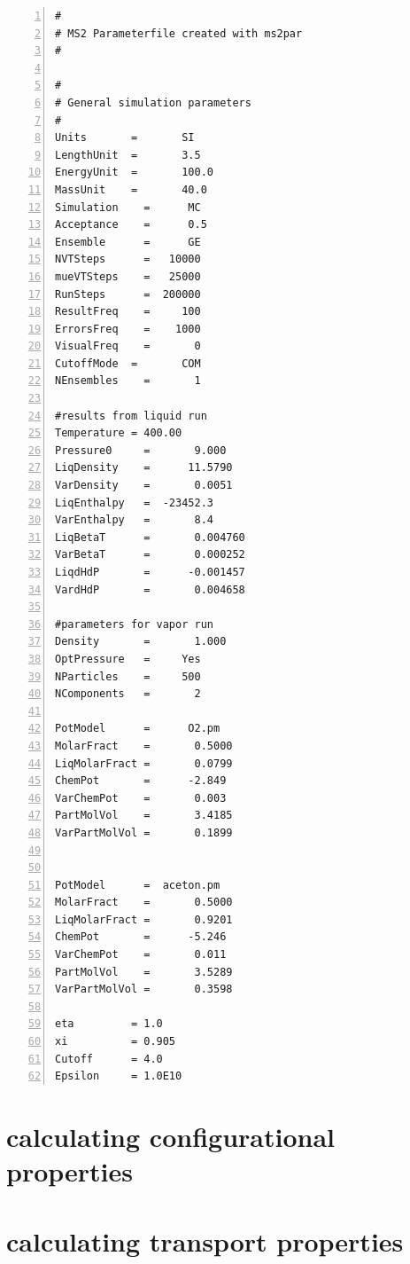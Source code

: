\begin{Verbatim}[frame=single,framesep=6.5mm,label=\fbox{VLE \ce{O2} -- Aceton mixture},numbers=left,numbersep=-10pt,xrightmargin=5cm]
#
# MS2 Parameterfile created with ms2par
#

#
# General simulation parameters
#
Units       =       SI
LengthUnit  =       3.5
EnergyUnit  =       100.0
MassUnit    =       40.0
Simulation    =      MC
Acceptance    =      0.5
Ensemble      =      GE
NVTSteps      =   10000
mueVTSteps    =   25000
RunSteps      =  200000
ResultFreq    =     100
ErrorsFreq    =    1000
VisualFreq    =       0
CutoffMode  =       COM
NEnsembles    =       1

#results from liquid run
Temperature = 400.00   
Pressure0     =       9.000
LiqDensity    =      11.5790
VarDensity    =       0.0051
LiqEnthalpy   =  -23452.3
VarEnthalpy   =       8.4
LiqBetaT      =       0.004760
VarBetaT      =       0.000252
LiqdHdP       =      -0.001457
VardHdP       =       0.004658

#parameters for vapor run
Density       =       1.000
OptPressure   =     Yes
NParticles    =     500
NComponents   =       2

PotModel      =      O2.pm
MolarFract    =       0.5000
LiqMolarFract =       0.0799
ChemPot       =      -2.849
VarChemPot    =       0.003
PartMolVol    =       3.4185
VarPartMolVol =       0.1899


PotModel      =  aceton.pm
MolarFract    =       0.5000
LiqMolarFract =       0.9201
ChemPot       =      -5.246
VarChemPot    =       0.011
PartMolVol    =       3.5289
VarPartMolVol =       0.3598

eta         = 1.0
xi          = 0.905
Cutoff      = 4.0
Epsilon     = 1.0E10
\end{Verbatim}



\section{calculating configurational properties}
\label{sec:Example_calculating configurational properties}





\section{calculating transport properties}
\label{sec:Example_calculating transport properties}






